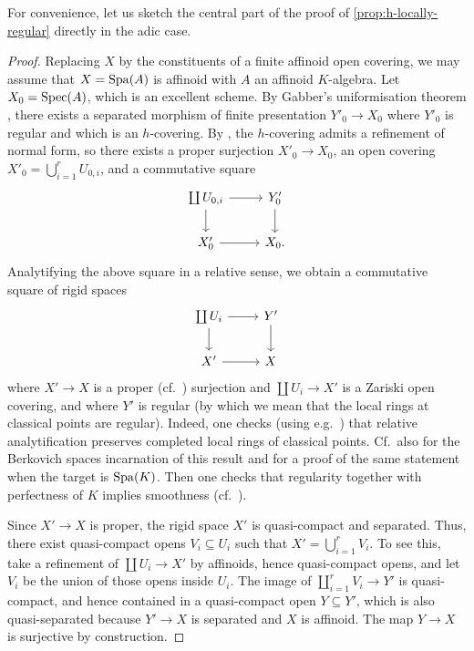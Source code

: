 For convenience, let us sketch the central part of the proof of \cref{prop:h-locally-regular} directly in the adic case.

\begin{proof}
Replacing $X$ by the constituents of a finite affinoid open covering, we may assume that $X=\operatorname{Spa}(A)$ is affinoid with $A$ an affinoid $K$-algebra. Let $X_0=\operatorname{Spec}(A)$, which is an excellent scheme. By Gabber's uniformisation theorem \cite[Th\'eor\`eme~1.1]{TravauxGabberIX}, there exists a separated morphism of finite presentation $Y'_0\to X_0$ where $Y'_0$ is regular and which is an $h$-covering. By \cite[Corollary~10.4]{SuslinVoevodsky}, the $h$-covering admits a refinement of normal form, so there exists a proper surjection $X'_0\to X_0$, an open covering $X'_0 = \bigcup_{i=1}^r U_{0,i}$, and a commutative square
\[ 
    \begin{tikzcd}
        \coprod U_{0,i} \ar[d] \ar[r] & Y'_0 \ar[d] \\
        X'_0 \ar[r] & X_0.
    \end{tikzcd}
\]
Analytifying the above square in a relative sense, we obtain a commutative square of rigid spaces 
\[ 
    \begin{tikzcd}
        \coprod U_i \ar[d] \ar[r] & Y' \ar[d] \\
        X'\ar[r] & X
    \end{tikzcd}
\]
where $X'\to X$ is a proper  (cf.~\cite[Lemma~5.7.3]{HuberBook}) surjection and $\coprod U_i \to X'$ is a Zariski open covering, and where $Y'$ is regular (by which we mean that the local rings at classical points are regular).
Indeed, one checks (using e.g.\ \cite[Satz 2.1]{Kopf}) that relative analytification preserves completed local rings of classical points. Cf.\ also \cite[Lemma 2.6.3]{Berkovich:EtaleCohomology} for the Berkovich spaces incarnation of this result and \cite[I \S 4.1, Proposition 2]{Bosch} for a proof of the same statement when the target is $\operatorname{Spa}(K)$. Then one checks that regularity together with perfectness of $K$ implies smoothness (cf.\ \cite[\S 5]{Berkovich:VanishingCyclesAnalytic}).

Since $X'\to X$ is proper, the rigid space $X'$ is quasi-compact and separated. Thus, there exist quasi-compact opens $V_i\subseteq U_i$ such that $X'=\bigcup_{i=1}^r V_i$. To see this, take a refinement of $\coprod U_i \to X'$ by affinoids, hence quasi-compact opens, and let $V_i$ be the union of those opens inside $U_i$. The image of $\coprod _{i=1}^r V_i\to Y'$ is quasi-compact, and hence contained in a quasi-compact open $Y\subseteq Y'$, which is also quasi-separated because $Y'\to X$ is separated and $X$ is affinoid. The map $Y\to X$ is surjective by construction. 
\end{proof}

